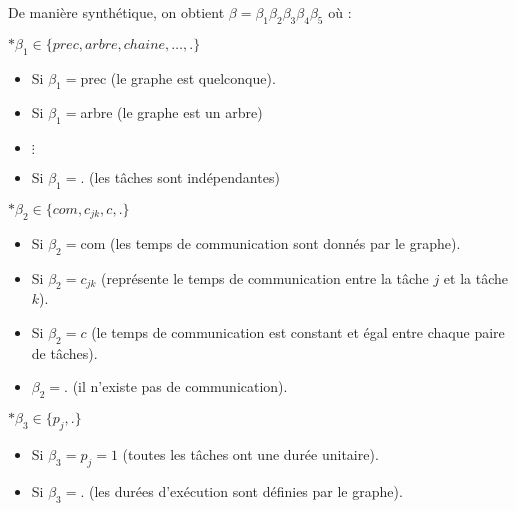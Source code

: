 \documentclass[a4paper,11pt]{article}
\begin{document}
\begin{itemize}
        De manière synthétique, on obtient $\beta=\beta_1\beta_2\beta_3\beta_4\beta_5$ où :

        $\ast \beta_1 \in \{ prec,arbre,chaine,\ldots, .\}$

        \begin{itemize}

            \item Si $\beta_1=$prec (le graphe est quelconque).

            \item Si $\beta_1=$arbre (le graphe est un arbre)

            \item $\vdots$

            \item Si $\beta_1=.$ (les t\^aches sont indépendantes)

        \end{itemize}

        $\ast \beta_2 \in \{ com,c_{jk},c ,.\}$

        \begin{itemize}

            \item Si $\beta_2=$com (les temps de communication sont donnés par le graphe).

            \item Si $\beta_2=c_{jk}$ (représente le temps de communication entre la tâche $j$ et la
                tâche $k$).

            \item Si $\beta_2=c$ (le temps de communication est constant et égal entre chaque paire
                de tâches).

            \item $\beta_2=.$ (il n'existe pas de communication).

        \end{itemize}

        $\ast \beta_3 \in \{p_j,.\}$

        \begin{itemize}

            \item Si $\beta_3=p_j=1$ (toutes les t\^aches ont une durée unitaire).

            \item Si $\beta_3=.$ (les durées d'exécution sont définies par le graphe).

        \end{itemize}


\end{itemize}
\end{document}

